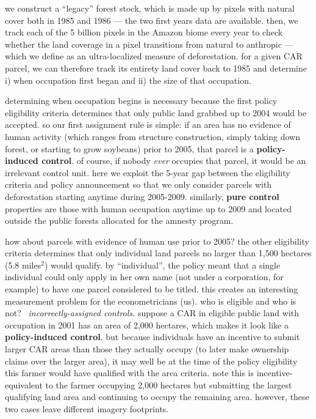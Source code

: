 \documentclass[12pt]{article}
\begin{document}
\quad we construct a ``legacy'' forest stock, which is made up by pixels with natural cover both in 1985 and 1986 --- the two first years data are available. then, we track each of the 5 billion pixels in the Amazon biome every year to check whether the land coverage in a pixel transitions from natural to anthropic --- which we define as an ultra-localized measure of deforestation. for a given CAR parcel, we can therefore track its entirety land cover back to 1985 and determine i) when occupation first began and ii) the size of that occupation.
\ 

\quad determining when occupation begins is necessary because the first policy eligibility criteria determines that only public land grabbed up to 2004 would be accepted. so our first assignment rule is simple: if an area has no evidence of human activity (which ranges from structure construction, simply taking down forest, or starting to grow soybeans) prior to 2005, that parcel is a \textbf{policy-induced control}. of course, if nobody \textit{ever} occupies that parcel, it would be an irrelevant control unit. here we exploit the 5-year gap between the eligibility criteria and policy announcement so that we only consider parcels with deforestation starting anytime during 2005-2009. similarly, \textbf{pure control} properties are those with human occupation anytime up to 2009 and located outside the public forests allocated for the amnesty program.
\

\quad how about parcels with evidence of human use prior to 2005? the other eligibility criteria determines that only individual land parcels no larger than 1,500 hectares (5.8 miles$^2$) would qualify. by ``individual'', the policy meant that a single individual could only apply in her own name (not under a corporation, for example) to have one parcel considered to be titled. this creates an interesting measurement problem for the econometricians (us). who is eligible and who is not?
\
\textit{incorrectly-assigned controls.} suppose a CAR in eligible public land with occupation in 2001 has an area of 2,000 hectares, which makes it look like a \textbf{policy-induced control}. but because individuals have an incentive to submit larger CAR areas than those they actually occupy (to later make ownership claims over the larger area), it may well be at the time of the policy eligibility this farmer would have qualified with the area criteria. note this is incentive-equivalent to the farmer occupying 2,000 hectares but submitting the largest qualifying land area and continuing to occupy the remaining area. however, these two cases leave different imagery footprints.
\end{document}
